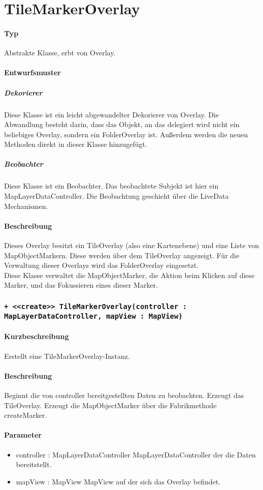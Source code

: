 \section{TileMarkerOverlay}
\paragraph*{Typ} 
Abstrakte Klasse, erbt von Overlay.
\paragraph*{Entwurfsmuster}
\subparagraph*{Dekorierer}
Diese Klasse ist ein leicht abgewandelter Dekorierer von Overlay.
Die Abwandlung besteht darin, dass das Objekt, an das delegiert wird nicht ein
beliebiges Overlay, sondern ein FolderOverlay ist. Außerdem werden die neuen 
Methoden direkt in dieser Klasse hinzugefügt.\\
\subparagraph*{Beobachter}
Diese Klasse ist ein Beobachter. Das beobachtete Subjekt ist hier ein MapLayerDataController.
Die Beobachtung geschieht über die LiveData Mechanismen.
\paragraph*{Beschreibung}
Dieses Overlay besitzt ein TileOverlay (also eine Kartenebene) und eine 
Liste von MapObjectMarkern. Diese werden über dem TileOverlay angezeigt.
Für die Verwaltung dieser Overlays wird das FolderOverlay eingesetzt.\\
Diese Klasse verwaltet die MapObjectMarker, die Aktion beim Klicken auf diese Marker, 
und das Fokussieren eines dieser Marker.

\subsubsection{\texttt{+ <<create>> TileMarkerOverlay(controller : MapLayerDataController, mapView : MapView)}}%
\paragraph*{Kurzbeschreibung}
Erstellt eine TileMarkerOverlay-Instanz.
\paragraph*{Beschreibung}
Beginnt die von controller bereitgestellten Daten zu beobachten. Erzeugt das TileOverlay.
Erzeugt die MapObjectMarker über die Fabrikmethode createMarker.
\paragraph*{Parameter}
\begin{itemize}
    \item controller : MapLayerDataController MapLayerDataController der die Daten bereitstellt.
    \item mapView : MapView MapView auf der sich das Overlay befindet.
\end{itemize}

